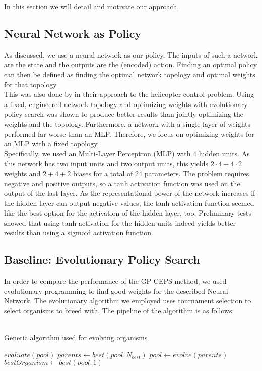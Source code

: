 In this section we will detail and motivate our approach. 

\subsection{Neural Network as Policy}

As discussed, we use a neural network as our policy. The inputs of such a network are the state and the outputs are the (encoded) action. Finding an optimal policy can then be defined as finding the optimal network topology and optimal weights for that topology.\\
This was also done by \cite{koppejan2011neuroevolutionary} in their approach to the helicopter control problem. Using a fixed, engineered network topology and optimizing weights with evolutionary policy search was shown to produce better results than jointly optimizing the weights and the topology. Furthermore, a network with a single layer of weights performed far worse than an MLP. Therefore, we focus on optimizing weights for an MLP with a fixed topology.\\
Specifically, we used an Multi-Layer Perceptron (MLP) with 4 hidden units. As this network has two input units and two output units, this yields $2 \cdot 4 + 4 \cdot 2$ weights and $2+4+2$ biases for a total of 24 parameters. The problem requires negative and positive outputs, so a tanh activation function was used on the output of the last layer. As the representational power of the network increases if the hidden layer can output negative values, the tanh activation function seemed like the best option for the activation of the hidden layer, too. Preliminary tests showed that using tanh activation for the hidden units indeed yields better results than using a sigmoid activation function. 

\subsection{Baseline: Evolutionary Policy Search}\label{evo_pol_search}

In order to compare the performance of the GP-CEPS method, we used evolutionary programming to find good weights for the described Neural Network. 
The evolutionary algorithm we employed uses tournament selection to select organisms to breed with. The pipeline of the algorithm is as follows:\\ \\

\begin{algorithm}[ht]
  \caption{Genetic algorithm used for evolving organisms}
  \begin{algorithmic}
      \State $evaluate(pool)$
      \State $parents \leftarrow best(pool, N_{best})$
      \State $pool \leftarrow evolve(parents)$
    \EndFor
    \State $bestOrganism \leftarrow best(pool,1)$
  \end{algorithmic}
\end{algorithm}

